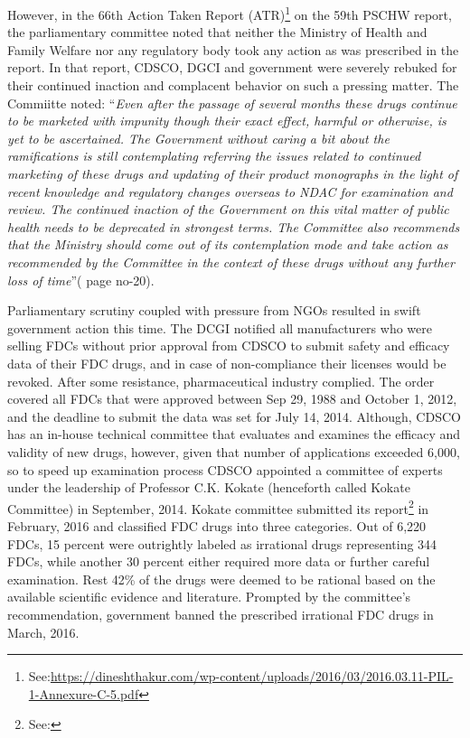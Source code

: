 \documentclass[AER]{AEA}
\theoremstyle{theorem}
\begin{document}
However, in the 66th Action Taken Report (ATR)\footnote{See:\url{https://dineshthakur.com/wp-content/uploads/2016/03/2016.03.11-PIL-1-Annexure-C-5.pdf}} on the 59th PSCHW report, the parliamentary committee noted that neither the Ministry of Health and Family Welfare nor any regulatory body took any  action as was prescribed in the report. In that report, CDSCO, DGCI and government were severely  rebuked for their continued inaction and complacent behavior on such a pressing matter. The Commiitte noted: ``\textit{Even after the passage of several months these drugs continue to be marketed with impunity though their exact effect, harmful or otherwise, is yet to be ascertained. The Government without caring a bit about the ramifications is still contemplating referring the issues related to continued marketing of these drugs and updating of their product monographs in the light of recent knowledge and regulatory changes overseas to NDAC for examination and review. The continued inaction of the Government on this vital matter of public health needs to be deprecated in strongest terms. The Committee also recommends that the Ministry should come out of its contemplation mode and take action as recommended by the Committee in the context of these  drugs without any further loss of time}''(\cite{ATR} page no-20).

Parliamentary scrutiny coupled with pressure from NGOs resulted in swift government action this time. The DCGI notified all manufacturers who were selling FDCs without prior approval from CDSCO to submit safety and efficacy data of their FDC drugs, and in case of non-compliance their licenses would be revoked. After some resistance, pharmaceutical industry complied. The order covered all FDCs that were approved between Sep 29, 1988 and October 1, 2012, and the deadline to submit the data was set for July 14, 2014. Although, CDSCO has an in-house technical committee that evaluates and examines the efficacy and validity of new drugs, however, given that number of applications exceeded 6,000, so to speed up examination process CDSCO appointed a committee of experts under the leadership of Professor C.K. Kokate (henceforth called Kokate Committee) in September, 2014. Kokate committee submitted its report\footnote{See: \FEight} in February, 2016 and classified FDC drugs into three categories.  Out of 6,220 FDCs, 15 percent were outrightly labeled as irrational drugs representing 344 FDCs, while another 30 percent either required more data or further careful examination. Rest 42\% of the drugs were deemed to be rational based on the available scientific evidence and literature. Prompted by the committee's recommendation, government banned the prescribed irrational FDC drugs  in March, 2016. 
\pagebreak
\end{document}
